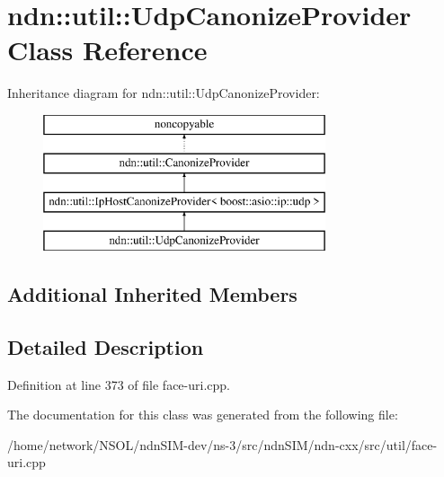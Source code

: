 \hypertarget{classndn_1_1util_1_1UdpCanonizeProvider}{}\section{ndn\+:\+:util\+:\+:Udp\+Canonize\+Provider Class Reference}
\label{classndn_1_1util_1_1UdpCanonizeProvider}
Inheritance diagram for ndn\+:\+:util\+:\+:Udp\+Canonize\+Provider\+:\begin{figure}[H]
\begin{center}
\leavevmode
\includegraphics[height=4.000000cm]{classndn_1_1util_1_1UdpCanonizeProvider}
\end{center}
\end{figure}
\subsection*{Additional Inherited Members}


\subsection{Detailed Description}


Definition at line 373 of file face-\/uri.\+cpp.



The documentation for this class was generated from the following file\+:\begin{DoxyCompactItemize}
\item 
/home/network/\+N\+S\+O\+L/ndn\+S\+I\+M-\/dev/ns-\/3/src/ndn\+S\+I\+M/ndn-\/cxx/src/util/face-\/uri.\+cpp\end{DoxyCompactItemize}
